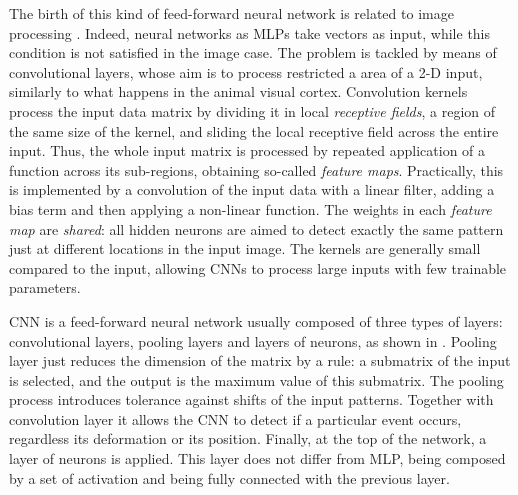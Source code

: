 The birth of this kind of feed-forward neural network is related to image processing \cite{lawrence1997face}. Indeed, neural networks as MLPs take vectors as input, while this condition is not satisfied in the image case. The problem is tackled by means of convolutional layers, whose aim is to process restricted a area of a 2-D input, similarly to what happens in the animal visual cortex.
Convolution kernels process the input data matrix by dividing it in local \textit{receptive fields}, a region of the same size of the kernel, and sliding the local receptive field across the entire input.
Thus, the whole input matrix is processed by repeated application of a function across its sub-regions, obtaining so-called \textit{feature maps}. Practically, this is implemented by a convolution of the input data with a linear filter, adding a bias term and then applying a non-linear function.
The weights in each \textit{feature map} are \textit{shared}: all hidden neurons are aimed to detect exactly the same pattern just at different locations in the input image. The kernels are generally small compared to the input, allowing CNNs to process large inputs with few trainable parameters.

%
%
%	


CNN is a feed-forward neural network \cite{726791} usually composed of three types of layers: convolutional layers, pooling layers and layers of neurons, as shown in . Pooling layer just reduces the dimension of the matrix by a rule: a submatrix of the input is selected, and the output is the maximum value of this submatrix.
The pooling process introduces tolerance against shifts of the input patterns. Together with convolution layer it allows the CNN to detect if a particular event occurs, regardless its deformation or its position.
Finally, at the top of the network, a layer of neurons is applied. This layer does not differ from MLP, being composed by a set of activation and being fully connected with the previous layer. 

